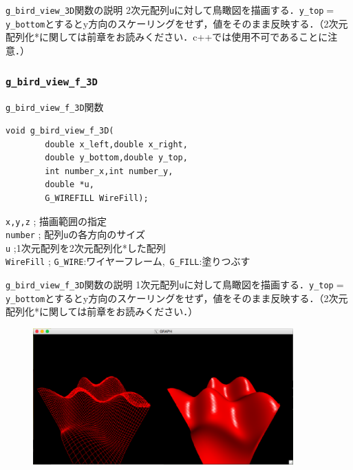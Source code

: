 \documentclass[a4paper,12pt]{jsarticle}%
\begin{document}
\begin{itembox}[l]{\texttt{g\_bird\_view\_3D}関数の説明}
2次元配列\verb|u|に対して鳥瞰図を描画する．\verb|y_top|$=$\verb|y_bottom|とするとy方向のスケーリングをせず，値をそのまま反映する．（2次元配列化*に関しては前章をお読みください．c++では使用不可であることに注意．）
\end{itembox}





\clearpage
\subsubsection{\texttt{g\_bird\_view\_f\_3D}}

\begin{itembox}[l]{\texttt{g\_bird\_view\_f\_3D}関数}
\begin{verbatim}
void g_bird_view_f_3D(
        double x_left,double x_right, 
        double y_bottom,double y_top,
        int number_x,int number_y,
        double *u,
        G_WIREFILL WireFill);
\end{verbatim}
\verb|x,y,z| ; 描画範囲の指定\\
\verb|number| ; 配列\verb|u|の各方向のサイズ\\
\verb|u| ;1次元配列を2次元配列化*した配列\\
\verb|WireFill| ; \verb|G_WIRE|:ワイヤーフレーム,\ \verb|G_FILL|:塗りつぶす \\
\end{itembox}

\begin{itembox}[l]{\texttt{g\_bird\_view\_f\_3D}関数の説明}
1次元配列\verb|u|に対して鳥瞰図を描画する．\verb|y_top|$=$\verb|y_bottom|とするとy方向のスケーリングをせず，値をそのまま反映する．（2次元配列化*に関しては前章をお読みください．）
\end{itembox}

\begin{figure}[htb]
	\includegraphics[width=100mm]{./Figures/eps/Canvas_g_bird_view.eps}
\end{figure}
\end{document}
